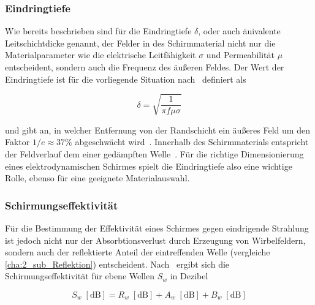 \subsubsection{Eindringtiefe}\label{cha:2_subsub_Eindringtiefe}

Wie bereits beschrieben sind für die Eindringtiefe $\delta$, oder auch äuivalente Leitschichtdicke genannt, der Felder in des Schirmmaterial nicht nur die Materialparameter wie die elektrische Leitfähigkeit $\sigma$ und Permeabilität $\mu$ entscheident, sondern auch die Frequenz des äußeren Feldes. Der Wert der Eindringtiefe ist für die vorliegende Situation nach~\cite{Taschenbuch_HF-Technik} definiert als

\begin{equation}
    \delta = \sqrt{\frac{1}{\pi f \mu \sigma}}
    \label{eq:2_Eindringtiefe}
\end{equation}

und gibt an, in welcher Entfernung von der Randschicht ein äußeres Feld um den Faktor $1/e \approx 37 \si{\percent}$ abgeschwächt wird~\cite{Taschenbuch_HF-Technik}. Innerhalb des Schirmmaterials entspricht der Feldverlauf dem einer gedämpften Welle~\cite{EM_Schirmung}. Für die richtige Dimensionierung eines elektrodynamischen Schirmes spielt die Eindringtiefe also eine wichtige Rolle, ebenso für eine geeignete Materialauswahl.


\subsubsection{Schirmungseffektivität}\label{cha:2_subsub_Schirmungseffektivitaet}

Für die Bestimmung der Effektivität eines Schirmes gegen eindrigende Strahlung ist jedoch nicht nur der Absorbtionsverlust durch Erzeugung von Wirbelfeldern, sondern auch der reflektierte Anteil der eintreffenden Welle (vergleiche \Abschnitt\ref{cha:2_sub_Reflektion}) entscheident. Nach~\cite{Problems_in_shielding_electronic_equiptment, NASA_SP-3067} ergibt sich die Schirmungseffektivität für ebene Wellen $S_w$ in Dezibel

\begin{equation}
    S_w \; \left[\text{dB}\right] = R_w \; \left[\text{dB}\right] + A_w \; \left[\text{dB}\right] + B_w \; \left[\text{dB}\right]
    \label{eq:2_Schirmungseffektivitaet}
\end{equation}

